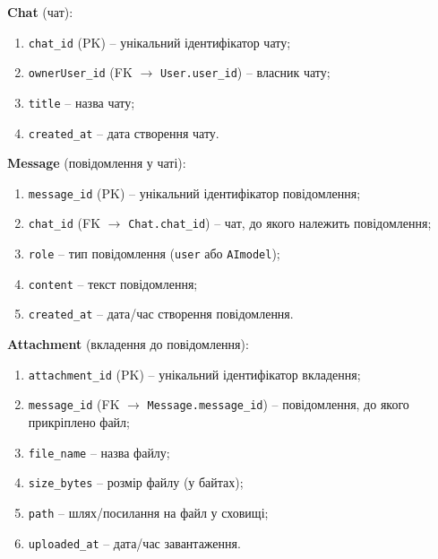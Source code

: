 \documentclass[12pt,a4paper]{article}
\begin{document}
    \vspace{0.75em}

    \noindent
    \textbf{Chat} (чат):

    \begin{enumerate}
        \item \texttt{chat\_id} (PK) -- унікальний ідентифікатор чату;
        \item \texttt{ownerUser\_id} (FK $\rightarrow$ \texttt{User.user\_id}) -- власник чату;
        \item \texttt{title} -- назва чату;
        \item \texttt{created\_at} -- дата створення чату.
    \end{enumerate}

    \vspace{0.75em}

    \noindent
    \textbf{Message} (повідомлення у чаті):

    \begin{enumerate}
        \item \texttt{message\_id} (PK) -- унікальний ідентифікатор повідомлення;
        \item \texttt{chat\_id} (FK $\rightarrow$ \texttt{Chat.chat\_id}) -- чат, до якого належить повідомлення;
        \item \texttt{role} -- тип повідомлення (\texttt{user} або \texttt{AImodel});
        \item \texttt{content} -- текст повідомлення;
        \item \texttt{created\_at} -- дата/час створення повідомлення.
    \end{enumerate}

    \vspace{0.75em}

    \noindent
    \textbf{Attachment} (вкладення до повідомлення):

    \begin{enumerate}
        \item \texttt{attachment\_id} (PK) -- унікальний ідентифікатор вкладення;
        \item \texttt{message\_id} (FK $\rightarrow$ \texttt{Message.message\_id}) -- повідомлення, до якого прикріплено файл;
        \item \texttt{file\_name} -- назва файлу;
        \item \texttt{size\_bytes} -- розмір файлу (у байтах);
        \item \texttt{path} -- шлях/посилання на файл у сховищі;
        \item \texttt{uploaded\_at} -- дата/час завантаження.
    \end{enumerate}
\end{document}

